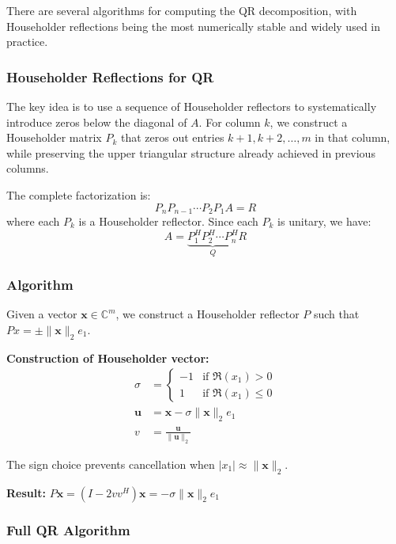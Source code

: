 \documentclass[../../main.tex]{subfiles}
\begin{document}
There are several algorithms for computing the QR decomposition, with Householder reflections being the most numerically stable and widely used in practice.

\subsubsection{Householder Reflections for QR}
The key idea is to use a sequence of Householder reflectors to systematically introduce zeros below the diagonal of $A$. For column $k$, we construct a Householder matrix $P_k$ that zeros out entries $k+1, k+2, \ldots, m$ in that column, while preserving the upper triangular structure already achieved in previous columns.

The complete factorization is:
\begin{equation}
    P_n P_{n-1} \cdots P_2 P_1 A = R
\end{equation}
where each $P_k$ is a Householder reflector. Since each $P_k$ is unitary, we have:
\begin{equation}
    A = \underbrace{P_1^H P_2^H \cdots P_n^H}_{Q} R
\end{equation}

\subsubsection{Algorithm}

Given a vector $\mathbf{x} \in \mathbb{C}^m$, we construct a Householder reflector $P$ such that $Px = \pm\|\mathbf{x}\|_2 e_1$.

\textbf{Construction of Householder vector:}
\begin{align}
    \sigma     & = \begin{cases}
                       -1 & \text{if } \Re(x_1) > 0    \\
                       1  & \text{if } \Re(x_1) \leq 0
                   \end{cases}          \\
    \mathbf{u} & = \mathbf{x} - \sigma \|\mathbf{x}\|_2 e_1 \\
    v          & = \frac{\mathbf{u}}{\|\mathbf{u}\|_2}
\end{align}

The sign choice prevents cancellation when $|x_1| \approx \|\mathbf{x}\|_2$.

\textbf{Result:} $P \mathbf{x} = (I - 2vv^H)\mathbf{x} = -\sigma \|\mathbf{x}\|_2 e_1$

\subsubsection{Full QR Algorithm}
\end{document}
